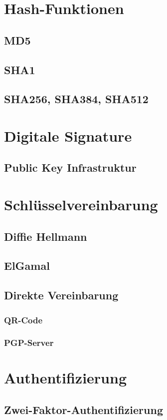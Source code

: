 \documentclass[10pt, a4paper]{scrreprt}
\begin{document}
\section{Hash-Funktionen}
\subsection{MD5}
\subsection{SHA1}
\subsection{SHA256, SHA384, SHA512}

\section{Digitale Signature}
\subsection{Public Key Infrastruktur}


\section{Schlüsselvereinbarung} 
\subsection{Diffie Hellmann}
\subsection{ElGamal}
\subsection{Direkte Vereinbarung}
\subsubsection{QR-Code}
\subsubsection{PGP-Server}
\section{Authentifizierung}
\subsection{Zwei-Faktor-Authentifizierung}
\end{document}
